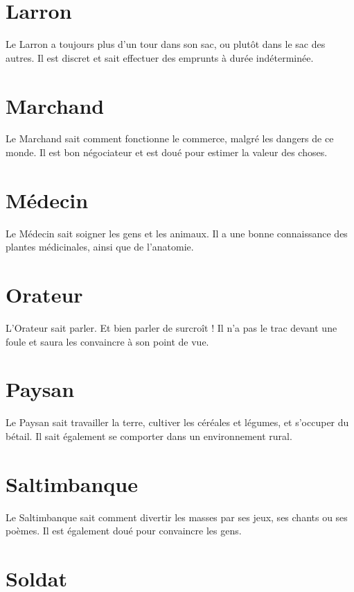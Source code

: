 \documentclass[a4paper,10pt,twoside,twocolumn,openany,bg=print]{dndbook}
\begin{document}
\section*{Larron}

Le Larron a toujours plus d'un tour dans son sac, ou plutôt dans le sac des autres. Il est discret et sait effectuer des emprunts à durée indéterminée.

\section*{Marchand}

Le Marchand sait comment fonctionne le commerce, malgré les dangers de ce monde. Il est bon négociateur et est doué pour estimer la valeur des choses.

\section*{Médecin}

Le Médecin sait soigner les gens et les animaux. Il a une bonne connaissance des plantes médicinales, ainsi que de l'anatomie.

\section*{Orateur}

L'Orateur sait parler. Et bien parler de surcroît ! Il n'a pas le trac devant une foule et saura les convaincre à son point de vue.

\section*{Paysan}

Le Paysan sait travailler la terre, cultiver les céréales et légumes, et s'occuper du bétail. Il sait également se comporter dans un environnement rural.

\section*{Saltimbanque}

Le Saltimbanque sait comment divertir les masses par ses jeux, ses chants ou ses poèmes. Il est également doué pour convaincre les gens.

\section*{Soldat}
\end{document}

